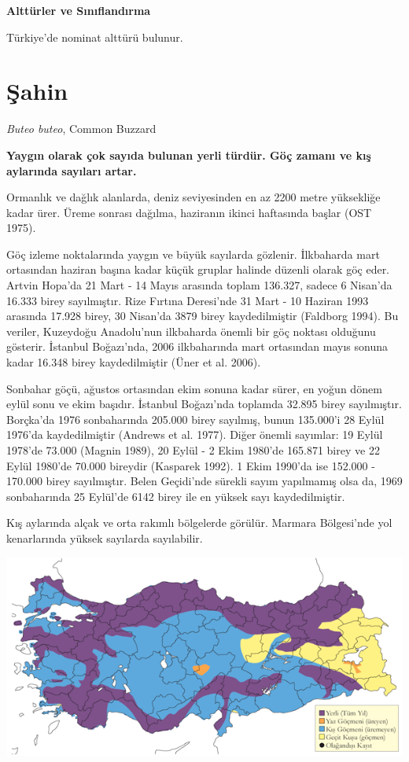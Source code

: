 \documentclass[
  letterpaper,
  DIV=11,
  numbers=noendperiod]{scrreprt}
\begin{document}
\textbf{Alttürler ve Sınıflandırma}

Türkiye'de nominat alttürü bulunur.

\section{Şahin}\label{ux15fahin}

\emph{Buteo buteo}, Common Buzzard

\textbf{Yaygın olarak çok sayıda bulunan yerli türdür. Göç zamanı ve kış
aylarında sayıları artar.}

Ormanlık ve dağlık alanlarda, deniz seviyesinden en az 2200 metre
yüksekliğe kadar ürer. Üreme sonrası dağılma, haziranın ikinci
haftasında başlar (OST 1975).

Göç izleme noktalarında yaygın ve büyük sayılarda gözlenir. İlkbaharda
mart ortasından haziran başına kadar küçük gruplar halinde düzenli
olarak göç eder. Artvin Hopa'da 21 Mart - 14 Mayıs arasında toplam
136.327, sadece 6 Nisan'da 16.333 birey sayılmıştır. Rize Fırtına
Deresi'nde 31 Mart - 10 Haziran 1993 arasında 17.928 birey, 30 Nisan'da
3879 birey kaydedilmiştir (Faldborg 1994). Bu veriler, Kuzeydoğu
Anadolu'nun ilkbaharda önemli bir göç noktası olduğunu gösterir.
İstanbul Boğazı'nda, 2006 ilkbaharında mart ortasından mayıs sonuna
kadar 16.348 birey kaydedilmiştir (Üner et al. 2006).

Sonbahar göçü, ağustos ortasından ekim sonuna kadar sürer, en yoğun
dönem eylül sonu ve ekim başıdır. İstanbul Boğazı'nda toplamda 32.895
birey sayılmıştır. Borçka'da 1976 sonbaharında 205.000 birey sayılmış,
bunun 135.000'i 28 Eylül 1976'da kaydedilmiştir (Andrews et al. 1977).
Diğer önemli sayımlar: 19 Eylül 1978'de 73.000 (Magnin 1989), 20 Eylül -
2 Ekim 1980'de 165.871 birey ve 22 Eylül 1980'de 70.000 bireydir
(Kasparek 1992). 1 Ekim 1990'da ise 152.000 - 170.000 birey sayılmıştır.
Belen Geçidi'nde sürekli sayım yapılmamış olsa da, 1969 sonbaharında 25
Eylül'de 6142 birey ile en yüksek sayı kaydedilmiştir.

Kış aylarında alçak ve orta rakımlı bölgelerde görülür. Marmara
Bölgesi'nde yol kenarlarında yüksek sayılarda sayılabilir.

\includegraphics{images/harita_Page_111.png}
\end{document}

